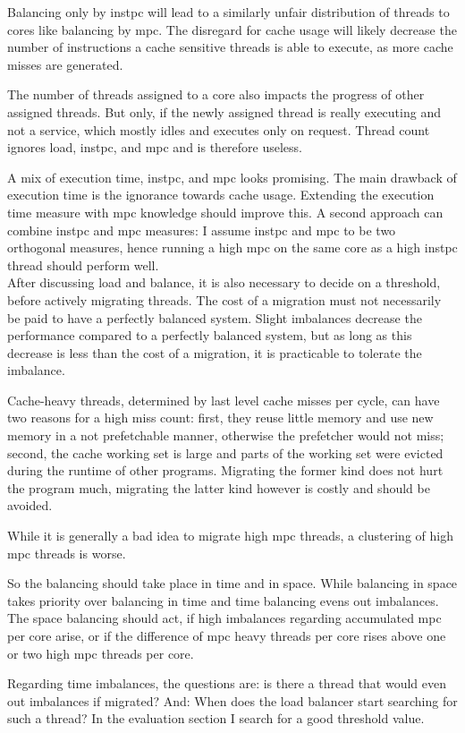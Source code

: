Balancing only by \gls{instpc} will lead to a similarly unfair distribution of
threads to cores like balancing by \gls{mpc}.
The disregard for cache usage will likely decrease the number of instructions
a cache sensitive threads is able to execute, as more cache misses are
generated.

The number of threads assigned to a core also impacts the progress of other
assigned threads.
But only, if the newly assigned thread is really executing and not a service,
which mostly idles and executes only on request.
Thread count ignores load, \gls{instpc}, and \gls{mpc} and is therefore
useless.

A mix of execution time, \gls{instpc}, and \gls{mpc} looks promising.
The main drawback of execution time is the ignorance towards cache usage.
Extending the execution time measure with \gls{mpc} knowledge should improve this.
A second approach can combine \gls{instpc} and \gls{mpc} measures: I assume
\gls{instpc} and \gls{mpc} to be two orthogonal measures, hence running a
high \gls{mpc} on the same core as a high \gls{instpc} thread should perform
well.
\\


After discussing load and balance, it is also necessary to decide on a
threshold, before actively migrating threads.
The cost of a migration must not necessarily be paid to have a perfectly
balanced system.
Slight imbalances decrease the performance compared to a perfectly balanced
system, but as long as this decrease is less than the cost of a migration,
it is practicable to tolerate the imbalance.

Cache-heavy threads, determined by last level cache misses per cycle, can have
two reasons for a high miss count: first, they reuse little memory and use new
memory in a not prefetchable manner, otherwise the prefetcher would not miss;
second, the cache working set is large and parts of the working set were
evicted during the runtime of other programs.
Migrating the former kind does not hurt the program much, migrating the latter
kind however is costly and should be avoided.

While it is generally a bad idea to migrate high \gls{mpc} threads, a
clustering of high \gls{mpc} threads is worse.

So the balancing should take place in time and in space.
While balancing in space takes priority over balancing in time and time 
balancing evens out imbalances.
The space balancing should act, if high imbalances regarding accumulated
\gls{mpc} per core arise, or if the difference of \gls{mpc} heavy threads per
core rises above one or two high \gls{mpc} threads per core.

Regarding time imbalances, the questions are: is there a thread that would even
out imbalances if migrated? And: When does the load balancer start searching
for such a thread?
In the evaluation section I search for a good threshold value.
